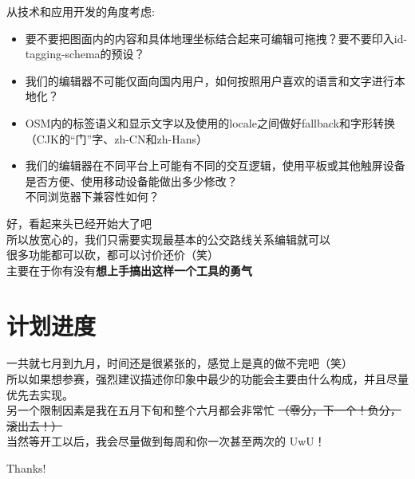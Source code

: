 \documentclass{beamer}
\begin{document}
\begin{frame}
    \Large
    从技术和应用开发的角度考虑: \\
    \normalsize
    \begin{itemize}
        \item 要不要把图面内的内容和具体地理坐标结合起来可编辑可拖拽？要不要印入id-tagging-schema的预设？
        \item 我们的编辑器不可能仅面向国内用户，如何按照用户喜欢的语言和文字进行本地化？
        \item OSM内的标签语义和显示文字以及使用的locale之间做好fallback和字形转换（CJK的“门”字、zh-CN和zh-Hans）
        \item 我们的编辑器在不同平台上可能有不同的交互逻辑，使用平板或其他触屏设备是否方便、使用移动设备能做出多少修改？\\
              不同浏览器下兼容性如何？
    \end{itemize}
\end{frame}

\begin{frame}
    \Large
    好，看起来头已经开始大了吧 \\
    \large
    \quad \quad 所以放宽心的，我们只需要实现最基本的公交路线关系编辑就可以 \\
    \quad \quad 很多功能都可以砍，都可以讨价还价（笑）\\
    \quad \quad 主要在于你有没有\textbf{想上手搞出这样一个工具的勇气}
\end{frame}

\section{计划进度}
\begin{frame}
    \quad \quad 一共就七月到九月，时间还是很紧张的，感觉上是真的做不完吧（笑） \\
    
    \quad \quad 所以如果想参赛，强烈建议描述你印象中最少的功能会主要由什么构成，并且尽量优先去实现。\\

    \quad \quad 另一个限制因素是我在五月下旬和整个六月都会非常忙
    \sout{（零分，下一个！负分，滚出去！）}\\

    \quad \quad 当然等开工以后，我会尽量做到每周和你一次甚至两次的 UwU！
\end{frame}

\begin{frame}
    \begin{center}
        {\Huge\calligra Thanks!}
    \end{center}
\end{frame}
\end{document}
